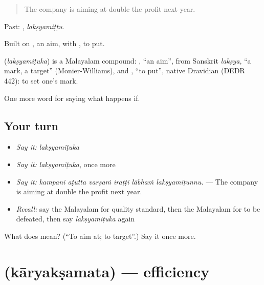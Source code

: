 \begin{quote}
The company is aiming at double the profit next year.
\end{quote}

Past: , \emph{lakṣyamiṭṭu}.

Built on , an aim, with , to put.

\begin{cousinweb}
\textbf{} (\emph{lakṣyamiṭuka}) is a Malayalam compound: , \textquotedblleft{}an aim\textquotedblright{}, from Sanskrit \emph{lakṣya}, \textquotedblleft{}a mark, a target\textquotedblright{} (Monier-Williams), and , \textquotedblleft{}to put\textquotedblright{}, native Dravidian (DEDR 442): to set one's mark.
\end{cousinweb}

\begin{grammarlens}[title={What you've built}]
One more word for saying what happens if.
\end{grammarlens}

\subsection*{Your turn}
\begin{itemize}
\raggedright
  \item \emph{Say it:} \emph{lakṣyamiṭuka}
  \item \emph{Say it:} \emph{lakṣyamiṭuka}, once more
  \item \emph{Say it:} \emph{kampani aṭutta varṣaṁ iraṭṭi lābhaṁ lakṣyamiṭunnu.} — The company is aiming at double the profit next year.
  \item \emph{Recall:} say the Malayalam for quality standard, then the Malayalam for to be defeated, then say \emph{lakṣyamiṭuka} again
\end{itemize}

\begin{tcolorbox}[breakable,colback=teal!4,colframe=teal!35!black,title={Before you move on}]
What does  mean? (\textquotedblleft{}To aim at; to target\textquotedblright{}.) Say it once more.
\end{tcolorbox}
\section[\texorpdfstring{\ml{കാര്യക്ഷമത} (kāryakṣamata)}{കാര്യക്ഷമത (kāryakṣamata)}]{ (kāryakṣamata) — efficiency}

